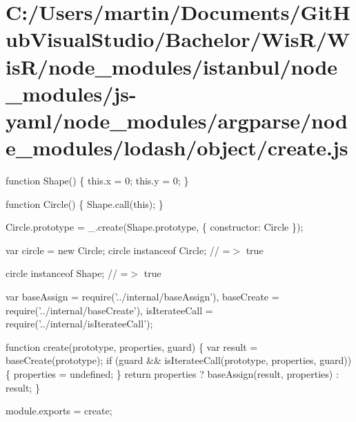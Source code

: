 \hypertarget{_c_1_2_users_2martin_2_documents_2_git_hub_visual_studio_2_bachelor_2_wis_r_2_wis_r_2node_module09ee77f78c0d693488ab0307da8e8e5a}{}\section{C\+:/\+Users/martin/\+Documents/\+Git\+Hub\+Visual\+Studio/\+Bachelor/\+Wis\+R/\+Wis\+R/node\+\_\+modules/istanbul/node\+\_\+modules/js-\/yaml/node\+\_\+modules/argparse/node\+\_\+modules/lodash/object/create.\+js}
function Shape() \{ this.\+x = 0; this.\+y = 0; \}

function Circle() \{ Shape.\+call(this); \}

Circle.\+prototype = \+\_\+.\+create(Shape.\+prototype, \{ \textquotesingle{}constructor\textquotesingle{}\+: Circle \});

var circle = new Circle; circle instanceof Circle; // =$>$ true

circle instanceof Shape; // =$>$ true


\begin{DoxyCodeInclude}
var baseAssign = require(\textcolor{stringliteral}{'../internal/baseAssign'}),
    baseCreate = require(\textcolor{stringliteral}{'../internal/baseCreate'}),
    isIterateeCall = require(\textcolor{stringliteral}{'../internal/isIterateeCall'});

\textcolor{keyword}{function} create(prototype, properties, guard) \{
  var result = baseCreate(prototype);
  \textcolor{keywordflow}{if} (guard && isIterateeCall(prototype, properties, guard)) \{
    properties = undefined;
  \}
  \textcolor{keywordflow}{return} properties ? baseAssign(result, properties) : result;
\}

module.exports = create;
\end{DoxyCodeInclude}
 